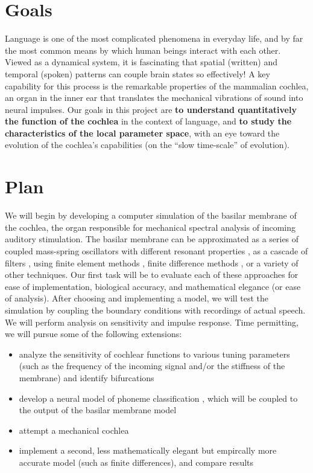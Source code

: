 

\section{Goals}

Language is one of the most complicated phenomena in everyday life, and by far
the most common means by which human beings interact with each other. Viewed as
a dynamical system, it is fascinating that spatial (written) and temporal
(spoken) patterns can couple brain states so effectively! A key capability for
this process is the remarkable properties of the mammalian cochlea, an organ in the inner ear
that translates the mechanical vibrations of sound into neural impulses. Our
goals in this project are \textbf{to understand quantitatively the function of
the cochlea} in the context of language, and \textbf{to study the
characteristics of the local parameter space}, with an eye toward the evolution
of the cochlea's capabilities (on the ``slow time-scale'' of evolution\cite{manley72}).

\section{Plan}

We will begin by developing a computer simulation of the basilar membrane of
the cochlea, the organ responsible for mechanical spectral analysis of incoming
auditory stimulation\cite{nilsen99,ruggero97}. The basilar membrane can be
approximated as a series of coupled mass-spring oscillators with different
resonant properties \cite{hubbard06,hubbard96}, as a cascade of filters
\cite{linggard89}, using finite element methods \cite{skrodzka05}, finite difference methods \cite{givelberg03}, or a variety
of other techniques. Our first task will be to evaluate each of these
approaches for ease of implementation, biological accuracy, and mathematical
elegance (or ease of analysis). After choosing and implementing a model, we
will test the simulation by coupling the boundary conditions with recordings of
actual speech. We will perform analysis on sensitivity and impulse response. Time permitting, we will pursue some of the following
extensions:

\begin{itemize}
	\item analyze the sensitivity of cochlear functions to various tuning parameters (such as the frequency of the incoming signal and/or the stiffness of the membrane) \cite{yates90} and identify bifurcations
	\item develop a neural model of phoneme classification \cite{mesgarani08}, which will be coupled to the output of the
basilar membrane model
	\item attempt a mechanical cochlea \cite{hubbard06,keolian97}
	\item implement a second, less mathematically elegant but empircally more accurate model (such as finite differences), and compare results
\end{itemize}






